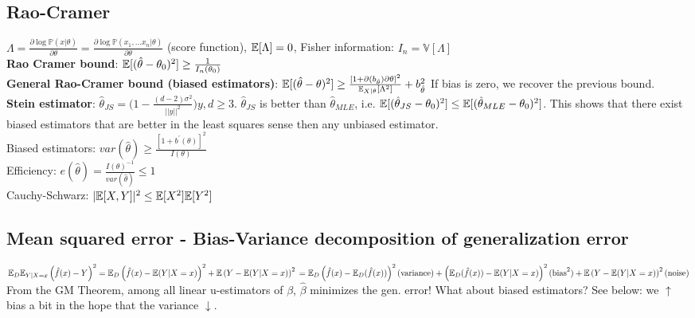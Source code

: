 \subsection*{Rao-Cramer}
$\Lambda = \frac{\partial \log \mathbb{P}(x|\theta )}{\partial \theta}=\frac{\partial \log \mathbb{P}(x_1,...x_n|\theta )}{\partial \theta}$ (score function), $\mathbb E[\Lambda ]=0$,
Fisher information: $I_n= \mathbb{V}[\Lambda]$ \\
\textbf{Rao Cramer bound}: $\mathbb E[(\hat{\theta}-\theta_0)^2]\geq \frac{1}{I_n(\theta_0)}$\\
\textbf{General Rao-Cramer bound (biased estimators)}:
$\mathbb E[(\hat \theta -\theta )^{2}] \geq \frac{[ 1+ \partial (b_{\hat \theta})\partial \theta]^{2}}{\mathbb E_{X|\theta}[\Lambda ^{2}]} + b_{\hat \theta}^{2}$ If bias is zero, we recover the previous bound.\\
\textbf{Stein estimator}: $\hat{\theta}_{JS}=\big(1-\frac{(d-2)\sigma^2}{||y||^2}\big)y, d\geq 3$. $\hat{\theta}_{JS}$ is better than $\hat{\theta}_{MLE}$, i.e. $\mathbb E[(\hat{\theta}_{JS}-\theta_0)^2]\leq \mathbb E[(\hat{\theta}_{MLE}-\theta_0)^2]$. This shows that there exist biased estimators that are better in the least squares sense then any unbiased estimator.\\

Biased estimators: $var(\hat{\theta}) \geq \frac{[1 + b^{\prime}(\theta)]^2}{I(\theta)}$ \\
Efficiency: $e(\hat{\theta}) = \frac{I(\theta)^{-1}}{var(\hat{\theta})} \leq 1$ \\
Cauchy-Schwarz: $|\mathbb E[X,Y]|^2 \leq \mathbb E[X^2] \mathbb E[Y^2]$ 

\subsection*{Mean squared error - Bias-Variance decomposition of generalization error}
\setlength{\mathindent}{0cm}
$
\mathbb E_D\mathbb E_{Y|X=x}\left(\hat{f}(x)-Y\right)^2 = \\
\mathbb E_D\left(\hat{f}(x) - \mathbb E(Y|X=x)\right)^2 + \mathbb E\left(Y - \mathbb E(Y|X=x)\right)^2\\
= \mathbb E_D \left(\hat{f}(x) - \mathbb E_D(\hat{f}(x))\right)^2 \text{(variance)}\\
+ \left(\mathbb E_D(\hat{f}(x)) - \mathbb E(Y|X=x)\right)^2 \text{(bias}^2)\\
+ \mathbb E\left(Y - \mathbb E(Y|X=x)\right)^2 \text{(noise)}
$\\
From the GM Theorem, among all linear u-estimators of $\beta$, $\hat \beta$ minimizes the gen. error! What about biased estimators? See below: we $\uparrow$ bias a bit in the hope that the variance $\downarrow$.

